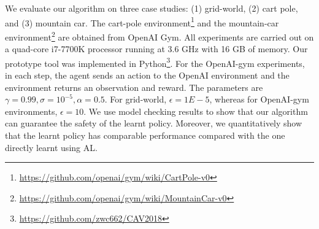 We evaluate our algorithm on three case studies: (1) grid-world, (2) cart pole, and (3) mountain car. The cart-pole environment\footnote{\url{https://github.com/openai/gym/wiki/CartPole-v0}} and the mountain-car environment\footnote{\url{https://github.com/openai/gym/wiki/MountainCar-v0}} are obtained from OpenAI Gym. All experiments are carried out on a quad-core i7-7700K processor running at 3.6 GHz with 16 GB of memory. 
Our prototype tool was implemented in Python\footnote{\url{https://github.com/zwc662/CAV2018}}.
For the OpenAI-gym experiments, in each step, the agent sends an action to the OpenAI environment and the environment returns an observation and reward. 
The parameters are $\gamma=0.99, \sigma=10^{-5}, \alpha=0.5$. For grid-world, $\epsilon=1E-5$, whereas for OpenAI-gym environments, $\epsilon=10$.
We use model checking results to show that our algorithm can guarantee the safety of the learnt policy. Moreover, we quantitatively show that the learnt policy has comparable performance compared with the one directly learnt using AL.

